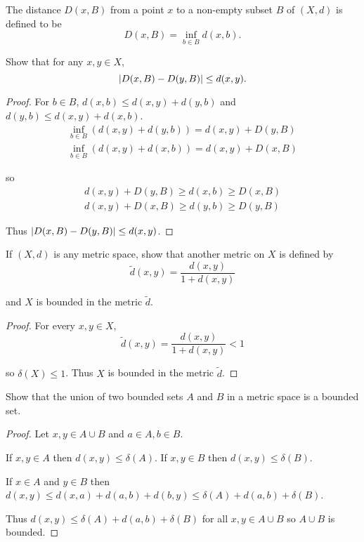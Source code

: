\begin{exercise}\label{chapter1:section2:exercise10}
    The distance $D(x, B)$ from a point $x$ to a non-empty subset $B$ of $(X, d)$ is defined to be
    \[
        D(x, B) = \inf\limits_{b\in B} d(x, b).
    \]

    Show that for any $x, y\in X$,
    \[
        \left\vert{D(x, B) - D(y, B)}\right\vert\leq d(x, y).
    \]
\end{exercise}

\begin{proof}
    For $b\in B$, $d(x, b)\leq d(x, y) + d(y, b)$ and $d(y, b)\leq d(x, y) + d(x, b)$.
    \[
        \begin{split}
            \inf\limits_{b\in B}(d(x, y) + d(y, b)) = d(x, y) + D(y, B) \\
            \inf\limits_{b\in B}(d(x, y) + d(x, b)) = d(x, y) + D(x, B)
        \end{split}
    \]

    so
    \[
        \begin{split}
            d(x, y) + D(y, B) \geq d(x, b)\geq D(x, B) \\
            d(x, y) + D(x, B) \geq d(y, b)\geq D(y, B)
        \end{split}
    \]

    Thus $\left\vert{D(x, B) - D(y, B)}\right\vert \leq d(x, y)$.
\end{proof}

\begin{exercise}\label{chapter1:section2:exercise11}
    If $(X, d)$ is any metric space, show that another metric on $X$ is defined by
    \[
        \widetilde{d}(x, y) = \frac{d(x, y)}{1 + d(x, y)}
    \]

    and $X$ is bounded in the metric $\widetilde{d}$.
\end{exercise}

\begin{proof}
    For every $x, y\in X$,
    \[
        \widetilde{d}(x, y) = \frac{d(x, y)}{1 + d(x, y)} < 1
    \]

    so $\delta(X)\leq 1$. Thus $X$ is bounded in the metric $\widetilde{d}$.
\end{proof}

\begin{exercise}\label{chapter1:section2:exercise12}
    Show that the union of two bounded sets $A$ and $B$ in a metric space is a bounded set.
\end{exercise}

\begin{proof}
    Let $x, y\in A\cup B$ and $a\in A, b\in B$.

    If $x, y\in A$ then $d(x, y) \leq \delta(A)$. If $x, y\in B$ then $d(x, y) \leq \delta(B)$.

    If $x\in A$ and $y\in B$ then $d(x, y)\leq d(x, a) + d(a, b) + d(b, y) \leq \delta(A) + d(a, b) + \delta(B)$.

    Thus $d(x, y)\leq \delta(A) + d(a, b) + \delta(B)$ for all $x, y\in A\cup B$ so $A\cup B$ is bounded.
\end{proof}


